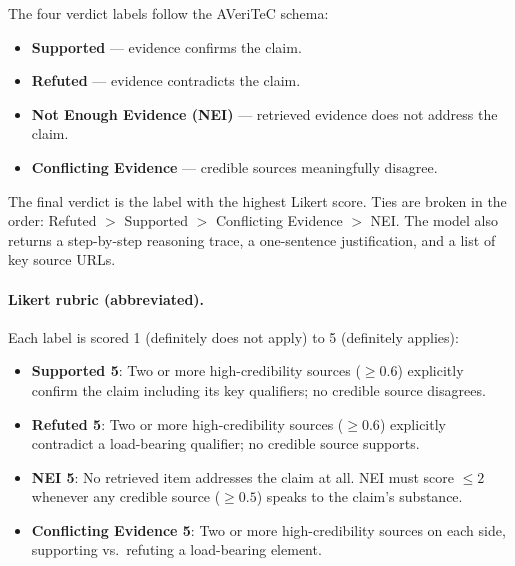The four verdict labels follow the AVeriTeC schema:
\begin{itemize}
  \item \textbf{Supported} --- evidence confirms the claim.
  \item \textbf{Refuted} --- evidence contradicts the claim.
  \item \textbf{Not Enough Evidence (NEI)} --- retrieved evidence does not address the claim.
  \item \textbf{Conflicting Evidence} --- credible sources meaningfully disagree.
\end{itemize}

The final verdict is the label with the highest Likert score. Ties are broken in the order: Refuted $>$ Supported $>$ Conflicting Evidence $>$ NEI. The model also returns a step-by-step reasoning trace, a one-sentence justification, and a list of key source URLs.

\paragraph{Likert rubric (abbreviated).}
Each label is scored 1 (definitely does not apply) to 5 (definitely applies):
\begin{itemize}
  \item \textbf{Supported 5}: Two or more high-credibility sources ($\geq 0.6$) explicitly confirm the claim including its key qualifiers; no credible source disagrees.
  \item \textbf{Refuted 5}: Two or more high-credibility sources ($\geq 0.6$) explicitly contradict a load-bearing qualifier; no credible source supports.
  \item \textbf{NEI 5}: No retrieved item addresses the claim at all. NEI must score $\leq 2$ whenever any credible source ($\geq 0.5$) speaks to the claim's substance.
  \item \textbf{Conflicting Evidence 5}: Two or more high-credibility sources on each side, supporting vs.\ refuting a load-bearing element.
\end{itemize}


